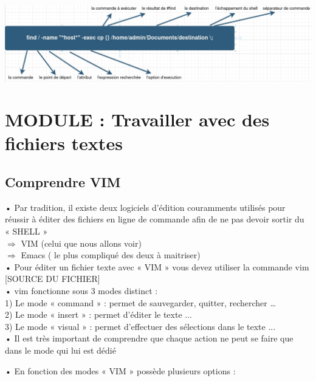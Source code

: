 \documentclass[a4paper, 11pt, french, oneside]{book}
\begin{document}
\begin{flushleft}
\includegraphics[scale=0.5]{Find.jpg}
\end{flushleft}
 
\chapter{MODULE : Travailler avec des fichiers textes}
\section{\Large Comprendre VIM} 

• Par tradition, il existe deux logiciels d’édition couramments utilisés pour réussir à éditer des fichiers en ligne de commande afin de ne pas devoir sortir du « SHELL »\\
 
$\Rightarrow$ VIM (celui que nous allons voir)\\
$\Rightarrow$ Emacs ( le plus compliqué des deux à maitriser)\\

• Pour éditer un fichier texte avec « VIM » vous devez utiliser la commande vim [SOURCE DU FICHIER]\\

• vim fonctionne sous 3 modes distinct :\\
1) Le mode « command » : permet de sauvegarder, quitter, rechercher …\\
2) Le mode « insert » : permet d’éditer le texte ...\\
3) Le mode « visual » : permet d’effectuer des sélections dans le texte ...\\

• Il est très important de comprendre que chaque action ne peut se faire que dans le
mode qui lui est dédié

• En fonction des modes « VIM » possède plusieurs options :\\
\end{document}
